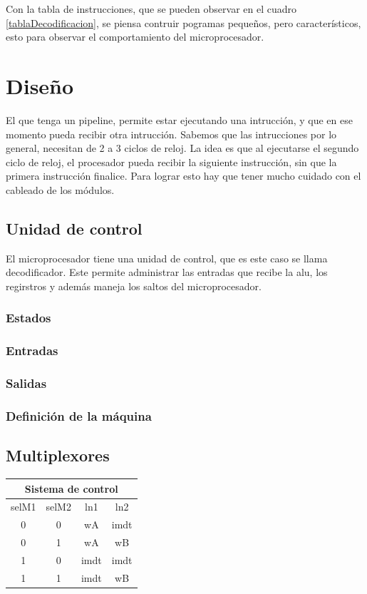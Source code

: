 \documentclass[paper=letter, fontsize=12pt]{article}
\begin{document}
Con la tabla de instrucciones, que se pueden observar en el cuadro \ref{tablaDecodificacion}, se piensa contruir pogramas pequeños, pero característicos, esto para observar el comportamiento del microprocesador.

\section{Diseño}

El que tenga un pipeline, permite estar ejecutando una intrucción, y que en ese momento pueda recibir otra intrucción. Sabemos que las intrucciones por lo general, necesitan de 2 a 3 ciclos de reloj. La idea es que al ejecutarse el segundo ciclo de reloj, el procesador pueda recibir la siguiente instrucción, sin que la primera instrucción finalice. Para lograr esto hay que tener mucho cuidado con el cableado de los módulos.

\subsection{Unidad de control}
El microprocesador tiene una unidad de control, que es este caso se llama decodificador. Este permite administrar las entradas que recibe la alu, los regirstros y además maneja los saltos del microprocesador.

\subsubsection{Estados}



\subsubsection{Entradas}

\subsubsection{Salidas}

\pagebreak
\subsubsection{Definición de la máquina}

\subsection{Multiplexores}

\begin{table}[h]
\centering
\begin{tabular}{cc|cc}
\multicolumn{4}{c}{Sistema de control} \\ \hline
selM1 & selM2 & ln1 	& ln2  \\ \hline
0     & 0     & wA 	& imdt \\
0     & 1     & wA	& wB   \\
1     & 0     & imdt	& imdt \\
1     & 1     & imdt	& wB   \\
\end{tabular}
\end{table}
\end{document}
